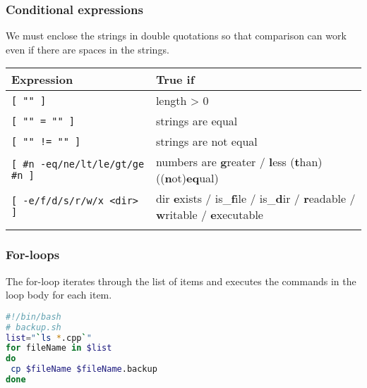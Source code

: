 \documentclass{article}
\begin{document}
\subsubsection{Conditional expressions}
We must enclose the strings in double quotations so that comparison can work even if there are spaces in the strings.
\begin{table}[H]
      \begin{tabular}{ll}
            \textbf{Expression}                      & \textbf{True if}                                                                                       \\ \hline
            \lstinline|[ "" ]|                       & length > 0                                                                                             \\ \arrayrulecolor{lightgray}\hline
            \lstinline|[ "" = "" ]|                  & strings are equal                                                                                      \\ \arrayrulecolor{lightgray}\hline
            \lstinline|[ "" != "" ]|                 & strings are not equal                                                                                  \\ \arrayrulecolor{lightgray}\hline
            \lstinline|[ #n -eq/ne/lt/le/gt/ge #n ]| & numbers are {\bf g}reater / {\bf l}ess ({\bf t}han) (({\bf n}ot){\bf eq}ual)                           \\ \arrayrulecolor{lightgray}\hline
            \lstinline|[ -e/f/d/s/r/w/x <dir> ]|     & dir {\bf e}xists / is\_{\bf f}ile / is\_{\bf d}ir / {\bf r}eadable / {\bf w}ritable / {\bf e}xecutable \\ \arrayrulecolor{lightgray}\hline
      \end{tabular}
\end{table}

\subsubsection{For-loops}
The for-loop iterates through the list of items and executes the commands in the loop body for each item.

\begin{lstlisting}[language=bash]
#!/bin/bash
# backup.sh
list="`ls *.cpp`"
for fileName in $list
do
 cp $fileName $fileName.backup
done \end{lstlisting}
\end{document}
